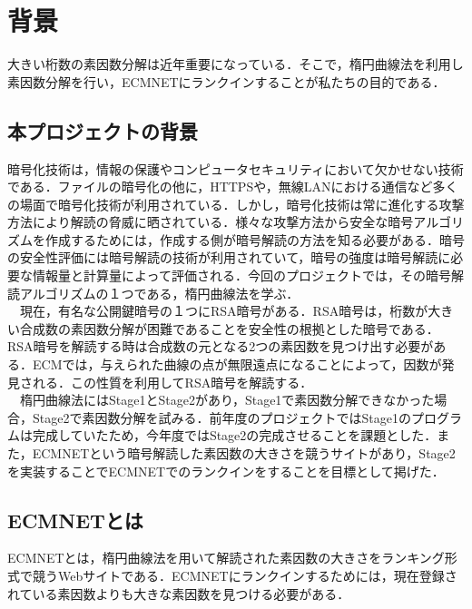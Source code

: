 \documentclass[openany,11pt,papersize]{jsbook}
\begin{document}
\tableofcontents%

\mainmatter%

\chapter{背景}

大きい桁数の素因数分解は近年重要になっている．そこで，楕円曲線法を利用し素因数分解を行い，ECMNETにランクインすることが私たちの目的である．


\section{本プロジェクトの背景}

暗号化技術は，情報の保護やコンピュータセキュリティにおいて欠かせない技術である．ファイルの暗号化の他に，HTTPSや，無線LANにおける通信など多くの場面で暗号化技術が利用されている．しかし，暗号化技術は常に進化する攻撃方法により解読の脅威に晒されている．様々な攻撃方法から安全な暗号アルゴリズムを作成するためには，作成する側が暗号解読の方法を知る必要がある．暗号の安全性評価には暗号解読の技術が利用されていて，暗号の強度は暗号解読に必要な情報量と計算量によって評価される．今回のプロジェクトでは，その暗号解読アルゴリズムの１つである，楕円曲線法を学ぶ．\\
　現在，有名な公開鍵暗号の１つにRSA暗号がある．RSA暗号は，桁数が大きい合成数の素因数分解が困難であることを安全性の根拠とした暗号である．RSA暗号を解読する時は合成数の元となる2つの素因数を見つけ出す必要がある．ECMでは，与えられた曲線の点が無限遠点になることによって，因数が発見される．この性質を利用してRSA暗号を解読する．\\
　楕円曲線法にはStage1とStage2があり，Stage1で素因数分解できなかった場合，Stage2で素因数分解を試みる．前年度のプロジェクトではStage1のプログラムは完成していたため，今年度ではStage2の完成させることを課題とした．また，ECMNETという暗号解読した素因数の大きさを競うサイトがあり，Stage2を実装することでECMNETでのランクインをすることを目標として掲げた．


\section{ECMNETとは}

ECMNETとは，楕円曲線法を用いて解読された素因数の大きさをランキング形式で競うWebサイトである．ECMNETにランクインするためには，現在登録されている素因数よりも大きな素因数を見つける必要がある．
\end{document}
